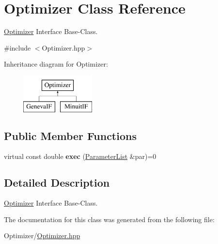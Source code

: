 \hypertarget{class_optimizer}{\section{Optimizer Class Reference}
\label{class_optimizer}
}


\hyperlink{class_optimizer}{Optimizer} Interface Base-\/\-Class.  




{\ttfamily \#include $<$Optimizer.\-hpp$>$}

Inheritance diagram for Optimizer\-:\begin{figure}[H]
\begin{center}
\leavevmode
\includegraphics[height=2.000000cm]{class_optimizer}
\end{center}
\end{figure}
\subsection*{Public Member Functions}
\begin{DoxyCompactItemize}
\item 
\hypertarget{class_optimizer_a45b0eab87396b95a86c4b4adddc9cb49}{virtual const double {\bfseries exec} (\hyperlink{class_parameter_list}{Parameter\-List} \&par)=0}\label{class_optimizer_a45b0eab87396b95a86c4b4adddc9cb49}

\end{DoxyCompactItemize}


\subsection{Detailed Description}
\hyperlink{class_optimizer}{Optimizer} Interface Base-\/\-Class. 

The documentation for this class was generated from the following file\-:\begin{DoxyCompactItemize}
\item 
Optimizer/\hyperlink{_optimizer_8hpp}{Optimizer.\-hpp}\end{DoxyCompactItemize}
